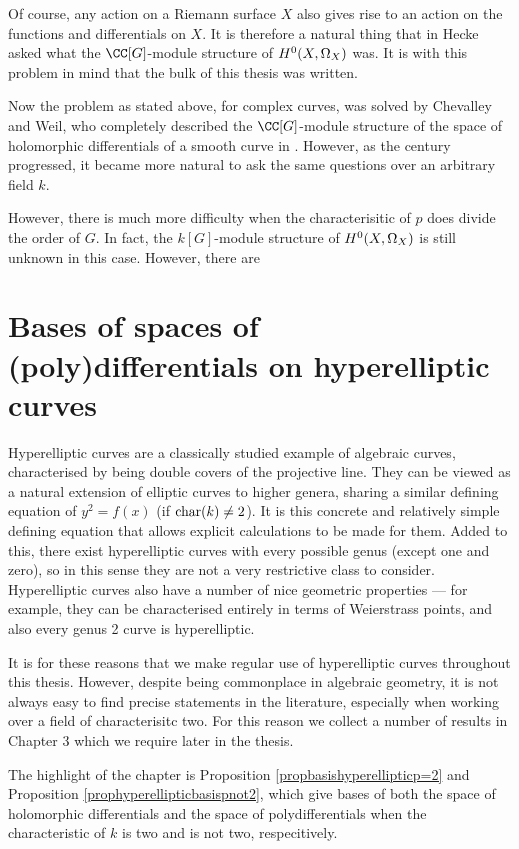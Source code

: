 Of course, any action on a Riemann surface $X$ also gives rise to an action on the functions and differentials on $X$.
It is therefore a natural thing that in  Hecke asked what the $\CC [G]$-module structure of ${H^0(X,\Omega_X)}$ was.
It is with this problem in mind that the bulk of this thesis was written.

Now the problem as stated above, for complex curves,  was solved by Chevalley and Weil, who completely described the $\CC[G]$-module structure of the space of holomorphic differentials of a smooth curve in .
However, as the century progressed, it became more natural to ask the same questions over an arbitrary field $k$.

However, there is much more difficulty when the characterisitic of $p$ does divide the order of $G$.
In fact, the $k[G]$-module structure of ${H^0(X,\Omega_X)}$ is still unknown in this case.
However, there are 


\section{Bases of spaces of (poly)differentials on hyperelliptic curves}

Hyperelliptic curves are a classically studied example of algebraic curves, characterised by being double covers of the projective line.
They can be viewed as a natural extension of elliptic curves to higher genera, sharing a similar defining equation of $y^2 = f(x)$ (if $\operatorname{char}(k) \neq 2$).
It is this concrete and relatively simple defining equation that allows explicit calculations to be made for them.
Added to this, there exist hyperelliptic curves with every possible genus (except one and zero), so in this sense they are not a very restrictive class to consider.
Hyperelliptic curves also have a number of nice geometric properties --- for example, they can be characterised entirely in terms of Weierstrass points, and also every genus 2 curve is hyperelliptic.

It is for these reasons that we make regular use of hyperelliptic curves throughout this thesis.
However, despite being commonplace in algebraic geometry, it is not always easy to find precise statements in the literature, especially when working over a field of characterisitc two.
For this reason we collect a number of results in Chapter 3 which we require later in the thesis.

The highlight of the chapter is Proposition \ref{propbasishyperellipticp=2} and Proposition \ref{prophyperellipticbasispnot2}, which give bases of both the space of holomorphic differentials and the space of polydifferentials when the characteristic of $k$ is two and is not two, respecitively.





